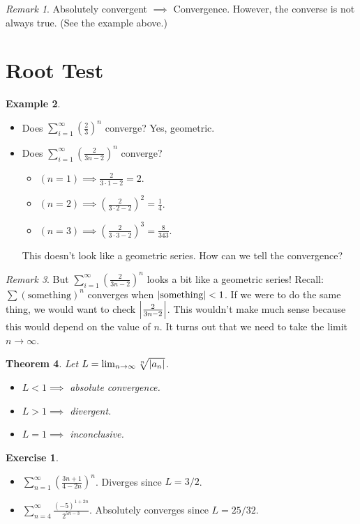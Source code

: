 \documentclass[12pt, psamsfonts]{amsart}
\newtheorem{thm}{Theorem}[section]
\theoremstyle{definition}
\newtheorem{exmp}[thm]{Example}
\newtheorem*{exer}{Exercise}
\theoremstyle{remark}
\newtheorem{rem}[thm]{Remark}
\numberwithin{equation}{section}
\begin{document}
\begin{rem}
  Absolutely convergent $\implies$ Convergence.
  However, the converse is not always true.
  (See the example above.)
\end{rem}

\section{Root Test}

\begin{exmp}
$ $
  \begin{itemize}
    \item
      Does $\sum_{i=1}^{\infty} (\frac{2}{3})^n$ converge?
      Yes, geometric.
    \item
      Does $\sum_{i=1}^{\infty} (\frac{2}{3n - 2})^n$ converge?
      \begin{itemize}
        \item
          $(n = 1) \implies \frac{2}{3 \cdot 1 - 2} = 2$.
        \item
          $(n = 2) \implies (\frac{2}{3 \cdot 2 - 2})^2= \frac{1}{4}$.
        \item
          $(n = 3) \implies (\frac{2}{3 \cdot 3 - 2})^3 = \frac{8}{343}$.
      \end{itemize}
      This doesn't look like a geometric series.
      How can we tell the convergence?
  \end{itemize}
\end{exmp}

\begin{rem}
  But $\sum_{i=1}^{\infty} (\frac{2}{3n - 2})^n$ looks a bit like a geometric series!
  Recall: $\sum (\text{something})^n$ converges when $\abs{\text{something}} < 1$.
  If we were to do the same thing, we would want to check $\abs{\frac{2}{3n - 2}}$.
  This wouldn't make much sense because this would depend on the value of $n$.
  It turns out that we need to take the limit $n \rightarrow \infty$.
\end{rem}

\begin{thm}
  Let $L = \lim_{n \rightarrow \infty} \sqrt[n]{\abs{a_n}}$.
  \begin{itemize}
    \item
      $L < 1 \implies$ absolute convergence.
    \item
      $L > 1 \implies$ divergent.
    \item
      $L = 1 \implies$ inconclusive.
  \end{itemize}
\end{thm}

\begin{exer}
$ $
  \begin{itemize}
    \item
      $\sum_{n=1}^{\infty} (\frac{3n + 1}{4 - 2n})^n$.
      Diverges since $L = 3/2$.
    \item
      $\sum_{n=4}^{\infty} \frac{(-5)^{1 + 2n}}{2^{5n - 3}}$.
      Absolutely converges since $L = 25/32$.
  \end{itemize}
\end{exer}
\end{document}
